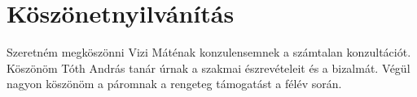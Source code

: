 \cleardoublepage{}
\chapter*{Köszönetnyilvánítás}

Szeretném megköszönni Vizi Máténak konzulensemnek a számtalan konzultációt. 
Köszönöm Tóth András tanár úrnak a szakmai észrevételeit és a bizalmát.  
Végül nagyon köszönöm a páromnak a rengeteg támogatást a félév során.


